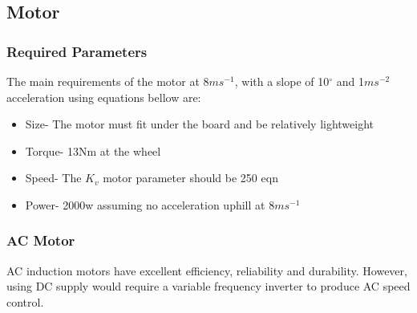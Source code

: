 \documentclass[journal,10pt]{IEEEtran}
\begin{document}
    \subsection{Motor}
        \subsubsection{Required Parameters}
        The main requirements of the motor at 8$ms^{-1}$, with a slope of 10$^{\circ}$ and 1$ms^{-2}$ acceleration using equations bellow are:
        \begin{itemize}
        	\item Size- The motor must fit under the board and be relatively lightweight
        	\item Torque- 13Nm at the wheel 
        	\item Speed- The $K_{v}$ motor parameter should be 250 eqn
        	\item Power- 2000w assuming no acceleration uphill at 8$ms^{-1}$
        \end{itemize}
        \begin{figure}[H]
            \centering
            \label{fig:equations}
        \end{figure}
        
        \subsubsection{AC Motor}
            AC induction motors have excellent efficiency, reliability and durability. However, using DC supply would require a variable frequency inverter to produce AC speed control. 
        \begin{figure}[H]
            \centering
            \label{fig:equations}
        \end{figure}
\end{document}
